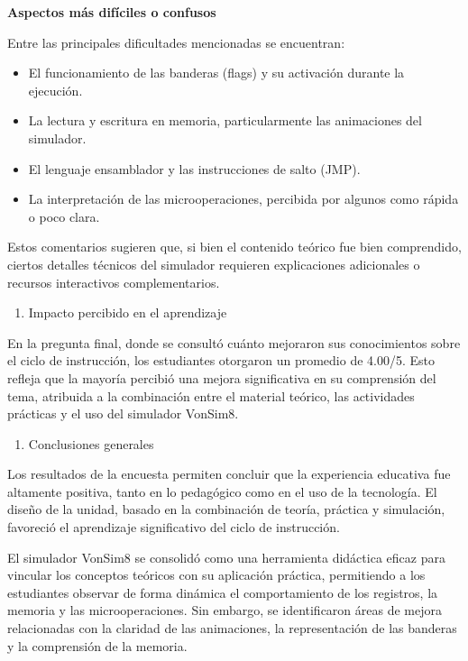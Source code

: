 \documentclass[12pt,oneside]{templates/unerthesis}
\providecommand{\tightlist}{%
  \setlength{\itemsep}{0pt}\setlength{\parskip}{0pt}}
\begin{document}
\textbf{Aspectos más difíciles o confusos}

Entre las principales dificultades mencionadas se encuentran:

\begin{itemize}
\item
  El funcionamiento de las banderas (flags) y su activación durante la ejecución.
\item
  La lectura y escritura en memoria, particularmente las animaciones del simulador.
\item
  El lenguaje ensamblador y las instrucciones de salto (JMP).
\item
  La interpretación de las microoperaciones, percibida por algunos como rápida o poco clara.
\end{itemize}

Estos comentarios sugieren que, si bien el contenido teórico fue bien comprendido, ciertos detalles técnicos del simulador requieren explicaciones adicionales o recursos interactivos complementarios.

\begin{enumerate}
\def\labelenumi{\arabic{enumi}.}
\setcounter{enumi}{4}
\tightlist
\item
  Impacto percibido en el aprendizaje
\end{enumerate}

En la pregunta final, donde se consultó cuánto mejoraron sus conocimientos sobre el ciclo de instrucción, los estudiantes otorgaron un promedio de 4.00/5.
Esto refleja que la mayoría percibió una mejora significativa en su comprensión del tema, atribuida a la combinación entre el material teórico, las actividades prácticas y el uso del simulador VonSim8.

\begin{enumerate}
\def\labelenumi{\arabic{enumi}.}
\setcounter{enumi}{5}
\tightlist
\item
  Conclusiones generales
\end{enumerate}

Los resultados de la encuesta permiten concluir que la experiencia educativa fue altamente positiva, tanto en lo pedagógico como en el uso de la tecnología. El diseño de la unidad, basado en la combinación de teoría, práctica y simulación, favoreció el aprendizaje significativo del ciclo de instrucción.

El simulador VonSim8 se consolidó como una herramienta didáctica eficaz para vincular los conceptos teóricos con su aplicación práctica, permitiendo a los estudiantes observar de forma dinámica el comportamiento de los registros, la memoria y las microoperaciones.
Sin embargo, se identificaron áreas de mejora relacionadas con la claridad de las animaciones, la representación de las banderas y la comprensión de la memoria.
\end{document}
